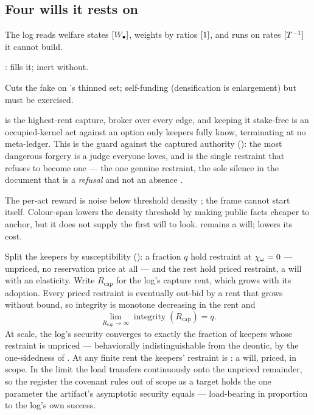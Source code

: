 \documentclass[../main]{subfiles}
\begin{document}
\subsection{Four wills it rests on}
\label{subsec:artifact:wills}
%
The log reads welfare states $[W\sb{\bullet}]$, weights by ratios $[1]$, and runs on rates $[T\sp{-1}]$
it cannot build.

\begin{serieslist}
   : fills it; inert without.

   Cuts the fake on 's thinned set; self-funding
    (densification is enlargement) but must be exercised.

    is the highest-rent capture, broker over every
    edge, and keeping it stake-free is an occupied-kernel act  against an option
    only keepers fully know, terminating at no meta-ledger. This is the guard against the
    captured authority (): the most dangerous forgery is a judge
    everyone loves, and  is the single restraint that refuses to become one --- the one
    genuine restraint, the sole silence in the document that is a \emph{refusal} and not an
    absence .

   The per-act reward is noise below threshold density ;
    the frame cannot start itself. Colour-span lowers the density threshold by making public
    facts cheaper to anchor, but it does not supply the first will to look. 
    remains a will;  lowers its cost.
\end{serieslist}

\begin{theorem}
  Split the keepers by susceptibility (): a fraction $q$ hold
  restraint at $\chi\sb{\omega}=0$ --- unpriced, no reservation price at all --- and the rest
  hold priced restraint, a will with an elasticity. Write $R_{\mathrm{cap}}$ for the
  log's capture rent, which grows with its adoption. Every priced restraint is
  eventually out-bid by a rent that grows without bound, so integrity is monotone
  decreasing in the rent and
  \begin{equation}
    \boxed{\ \lim_{R_{\mathrm{cap}}\to\infty}\operatorname{integrity}(R_{\mathrm{cap}})=q.\ }
    \label{eq:art:keepers}
  \end{equation}
  At scale, the log's security converges to exactly the fraction of keepers whose
  restraint is unpriced --- behaviorally indistinguishable from the deontic, by the
  one-sidedness of . At any finite rent the keepers' restraint is
  : a will, priced, in scope. In the limit the load transfers
  continuously onto the unpriced remainder, so the register the covenant rules out of
  scope as a target holds the one parameter the artifact's asymptotic security equals
  --- load-bearing in proportion to the log's own success.
\end{theorem}
\end{document}
